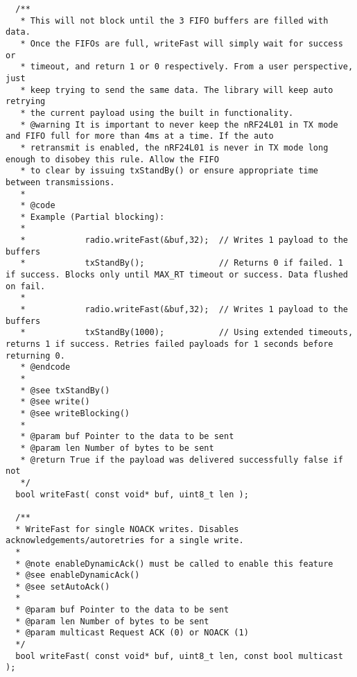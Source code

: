 \documentclass{article}
\begin{document}
\begin{itemize}
\begin{enumerate}
\begin{enumerate}
\begin{lstlisting}
  /**
   * This will not block until the 3 FIFO buffers are filled with data.
   * Once the FIFOs are full, writeFast will simply wait for success or
   * timeout, and return 1 or 0 respectively. From a user perspective, just
   * keep trying to send the same data. The library will keep auto retrying
   * the current payload using the built in functionality.
   * @warning It is important to never keep the nRF24L01 in TX mode and FIFO full for more than 4ms at a time. If the auto
   * retransmit is enabled, the nRF24L01 is never in TX mode long enough to disobey this rule. Allow the FIFO
   * to clear by issuing txStandBy() or ensure appropriate time between transmissions.
   *
   * @code
   * Example (Partial blocking):
   *
   *			radio.writeFast(&buf,32);  // Writes 1 payload to the buffers
   *			txStandBy();     		   // Returns 0 if failed. 1 if success. Blocks only until MAX_RT timeout or success. Data flushed on fail.
   *
   *			radio.writeFast(&buf,32);  // Writes 1 payload to the buffers
   *			txStandBy(1000);		   // Using extended timeouts, returns 1 if success. Retries failed payloads for 1 seconds before returning 0.
   * @endcode
   *
   * @see txStandBy()
   * @see write()
   * @see writeBlocking()
   *
   * @param buf Pointer to the data to be sent
   * @param len Number of bytes to be sent
   * @return True if the payload was delivered successfully false if not
   */
  bool writeFast( const void* buf, uint8_t len );

  /**
  * WriteFast for single NOACK writes. Disables acknowledgements/autoretries for a single write.
  *
  * @note enableDynamicAck() must be called to enable this feature
  * @see enableDynamicAck()
  * @see setAutoAck()
  *
  * @param buf Pointer to the data to be sent
  * @param len Number of bytes to be sent
  * @param multicast Request ACK (0) or NOACK (1)
  */
  bool writeFast( const void* buf, uint8_t len, const bool multicast );


\end{lstlisting}
\end{enumerate}
\end{enumerate}
\end{itemize}
\end{document}
